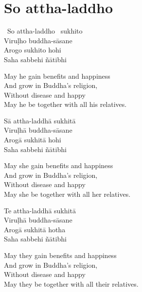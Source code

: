 \suttaRef{[AN 5.36]}

\section{So attha-laddho}
\label{so-attha-laddho}

\begin{pali-hangtogether}
  \anglebracketleft\ \hspace{-0.5mm}So attha-laddho \hspace{-0.5mm}\anglebracketright\ sukhito\\
  Viruḷho buddha-sāsane\\
  Arogo sukhito hohi\\
  Saha sabbehi ñātibhi
\end{pali-hangtogether}

\begin{english-verses}
  May he gain benefits and happiness\\
  And grow in Buddha's religion,\\
  Without disease and happy\\
  May he be together with all his relatives.
\end{english-verses}

\begin{pali-hang}
  Sā attha-laddhā sukhitā\\
  Viruḷhā buddha-sāsane\\
  Arogā sukhitā hohi\\
  Saha sabbehi ñātibhi
\end{pali-hang}

\begin{english-verses}
  May she gain benefits and happiness\\
  And grow in Buddha's religion,\\
  Without disease and happy\\
  May she be together with all her relatives.
\end{english-verses}

\begin{pali-hang}
  Te attha-laddhā sukhitā\\
  Viruḷhā buddha-sāsane\\
  Arogā sukhitā hotha\\
  Saha sabbehi ñātibhi
\end{pali-hang}

\begin{english-verses}
  May they gain benefits and happiness\\
  And grow in Buddha's religion,\\
  Without disease and happy\\
  May they be together with all their relatives.
\end{english-verses}

\suttaRef{[AN 3.155]}

